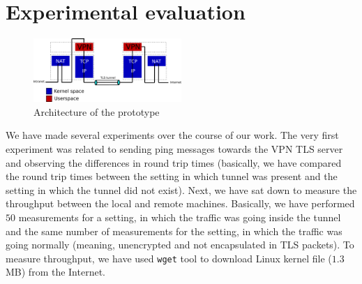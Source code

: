 \section{Experimental evaluation}
\label{section:experiments}



\begin{figure}[!h]
        \includegraphics[width=0.5\textwidth]{graphics/architecture.png}
        \caption{Architecture of the prototype}
        \label{fig:arch}
\end{figure}




We have made several experiments over the course of our work. The very first experiment was 
related to sending ping messages towards the VPN TLS server and observing the differences in
round trip times (basically, we have compared the round trip times between the setting in 
which tunnel was present and the setting in which the tunnel did not exist). Next, we have
sat down to measure the throughput between the local and remote machines. Basically, we have 
performed $50$ measurements for a setting, in which the traffic was going inside the tunnel
and the same number of measurements for the setting, in which the traffic was going 
normally (meaning, unencrypted and not encapsulated in TLS packets). To measure throughput,
we have used \texttt{wget} tool to download Linux kernel file ($1.3$MB) from the Internet.


